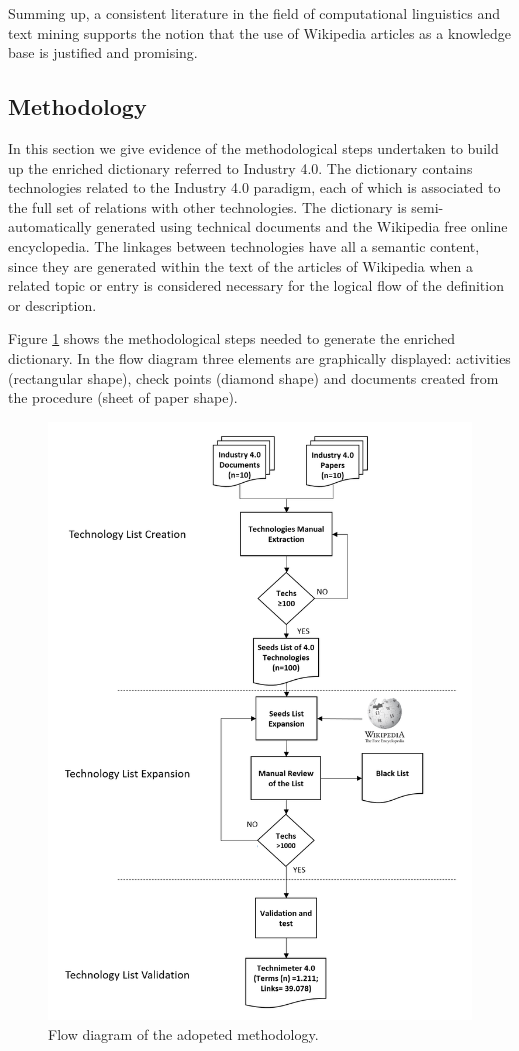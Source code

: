 \documentclass[b5paper,]{book}
\theoremstyle{definition}
\theoremstyle{definition}
\theoremstyle{definition}
\theoremstyle{remark}
\begin{document}
Summing up, a consistent literature in the field of computational
linguistics and text mining supports the notion that the use of
Wikipedia articles as a knowledge base is justified and promising.

\subsection{Methodology}\label{methodology-6}

In this section we give evidence of the methodological steps undertaken
to build up the enriched dictionary referred to Industry 4.0. The
dictionary contains technologies related to the Industry 4.0 paradigm,
each of which is associated to the full set of relations with other
technologies. The dictionary is semi-automatically generated using
technical documents and the Wikipedia free online encyclopedia. The
linkages between technologies have all a semantic content, since they
are generated within the text of the articles of Wikipedia when a
related topic or entry is considered necessary for the logical flow of
the definition or description.

Figure \ref{fig:wf40} shows the methodological steps needed to generate
the enriched dictionary. In the flow diagram three elements are
graphically displayed: activities (rectangular shape), check points
(diamond shape) and documents created from the procedure (sheet of paper
shape).

\begin{figure}

{\centering \includegraphics[width=0.8\linewidth]{_bookdown_files/figures/technimeter_03} 

}

\caption{Flow diagram of the adopeted methodology.}\label{fig:wf40}
\end{figure}
\end{document}
